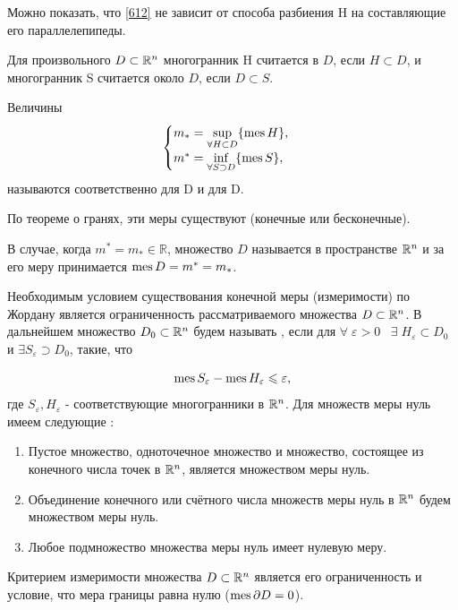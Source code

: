 Можно показать, что \eqref{612} не зависит от способа разбиения H на составляющие его параллелепипеды.

Для произвольного $D \subset \mathbb{R}^n$ многогранник H считается  в $D$, если $H \subset D$, и многогранник S считается   около $D$, если $D \subset S$.

Величины
\begin{equation}
	\label{613}
	\begin{cases}
		m_* = \underset{\forall H \subset D}{\sup} \{ \operatorname{mes} H \}, \\
		m^* = \underset{\forall S \supset D}{\inf} \{ \operatorname{mes} S \},
	\end{cases}
\end{equation}
называются соответственно  для D и  для D.

По теореме о гранях, эти меры существуют (конечные или бесконечные).

В случае, когда $ m^* = m_{*} \in \mathbb{R} $,
множество $ D $ называется   в пространстве $\mathbb{R}^n$ и за его меру принимается $\operatorname{mes} D = m^* = m_{*}$.

Необходимым условием существования конечной меры (измеримости) по Жордану является ограниченность рассматриваемого множества $D \subset \mathbb{R}^n$. В дальнейшем множество $D_0 \subset \mathbb{R}^n$ будем называть , если для $\forall\; \varepsilon > 0 \;\;\; \exists\; H_\varepsilon \subset D_0$ и $\exists S_\varepsilon \supset D_0$, такие, что

\begin{equation}
	\label{614}
	\operatorname{mes} S_\varepsilon - \operatorname{mes} H_\varepsilon \leqslant \varepsilon,
\end{equation}
где $S_\varepsilon, H_\varepsilon$ - соответствующие многогранники в $\mathbb{R}^n$.
\newpage
Для множеств меры нуль имеем следующие :
\begin{enumerate}
  \item Пустое множество, одноточечное множество и множество, состоящее из конечного числа точек в $\mathbb{R}^n$, является множеством меры нуль.
  \item Объединение конечного или счётного числа множеств меры нуль в $\mathbb{R}^n$ будем множеством меры нуль.
  \item Любое подмножество множества меры нуль имеет нулевую меру.
\end{enumerate}
Критерием измеримости множества $D \subset \mathbb{R}^n$ является его ограниченность и условие, что мера границы равна нулю ($ \operatorname{mes} \partial D = 0 $).

